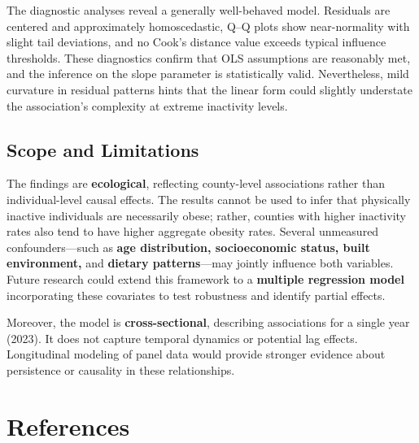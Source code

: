 \documentclass[
  letterpaper,
  DIV=11,
  numbers=noendperiod]{scrartcl}
\begin{document}
The diagnostic analyses reveal a generally well-behaved model. Residuals
are centered and approximately homoscedastic, Q--Q plots show
near-normality with slight tail deviations, and no Cook's distance value
exceeds typical influence thresholds. These diagnostics confirm that OLS
assumptions are reasonably met, and the inference on the slope parameter
is statistically valid. Nevertheless, mild curvature in residual
patterns hints that the linear form could slightly understate the
association's complexity at extreme inactivity levels.

\subsection{Scope and Limitations}\label{scope-and-limitations}

The findings are \textbf{ecological}, reflecting county-level
associations rather than individual-level causal effects. The results
cannot be used to infer that physically inactive individuals are
necessarily obese; rather, counties with higher inactivity rates also
tend to have higher aggregate obesity rates. Several unmeasured
confounders---such as \textbf{age distribution, socioeconomic status,
built environment,} and \textbf{dietary patterns}---may jointly
influence both variables. Future research could extend this framework to
a \textbf{multiple regression model} incorporating these covariates to
test robustness and identify partial effects.

Moreover, the model is \textbf{cross-sectional}, describing associations
for a single year (2023). It does not capture temporal dynamics or
potential lag effects. Longitudinal modeling of panel data would provide
stronger evidence about persistence or causality in these relationships.

\section*{References}\label{references}
\end{document}
